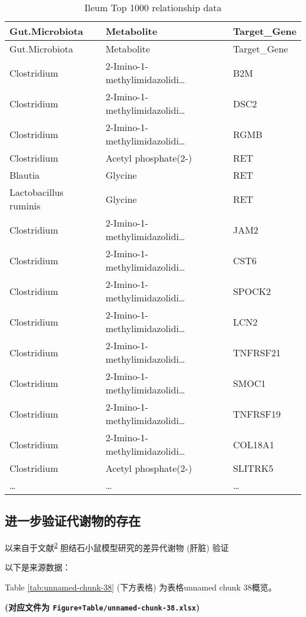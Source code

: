 \documentclass[
]{article}
\begin{document}
\begin{longtable}[]{@{}lll@{}}
\caption{\label{tab:Ileum-Top-1000-relationship-data}Ileum Top 1000 relationship data}\tabularnewline
\toprule
Gut.Microbiota & Metabolite & Target\_Gene\tabularnewline
\midrule
\endfirsthead
\toprule
Gut.Microbiota & Metabolite & Target\_Gene\tabularnewline
\midrule
\endhead
Clostridium & 2-Imino-1-methylimidazolidi\ldots{} & B2M\tabularnewline
Clostridium & 2-Imino-1-methylimidazolidi\ldots{} & DSC2\tabularnewline
Clostridium & 2-Imino-1-methylimidazolidi\ldots{} & RGMB\tabularnewline
Clostridium & Acetyl phosphate(2-) & RET\tabularnewline
Blautia & Glycine & RET\tabularnewline
Lactobacillus ruminis & Glycine & RET\tabularnewline
Clostridium & 2-Imino-1-methylimidazolidi\ldots{} & JAM2\tabularnewline
Clostridium & 2-Imino-1-methylimidazolidi\ldots{} & CST6\tabularnewline
Clostridium & 2-Imino-1-methylimidazolidi\ldots{} & SPOCK2\tabularnewline
Clostridium & 2-Imino-1-methylimidazolidi\ldots{} & LCN2\tabularnewline
Clostridium & 2-Imino-1-methylimidazolidi\ldots{} & TNFRSF21\tabularnewline
Clostridium & 2-Imino-1-methylimidazolidi\ldots{} & SMOC1\tabularnewline
Clostridium & 2-Imino-1-methylimidazolidi\ldots{} & TNFRSF19\tabularnewline
Clostridium & 2-Imino-1-methylimidazolidi\ldots{} & COL18A1\tabularnewline
Clostridium & Acetyl phosphate(2-) & SLITRK5\tabularnewline
\ldots{} & \ldots{} & \ldots{}\tabularnewline
\bottomrule
\end{longtable}

\hypertarget{ux8fdbux4e00ux6b65ux9a8cux8bc1ux4ee3ux8c22ux7269ux7684ux5b58ux5728}{%
\subsection{进一步验证代谢物的存在}\label{ux8fdbux4e00ux6b65ux9a8cux8bc1ux4ee3ux8c22ux7269ux7684ux5b58ux5728}}

以来自于文献\textsuperscript{\protect\hyperlink{ref-ChangesAndCorChen2021}{2}} 胆结石小鼠模型研究的差异代谢物 (肝脏) 验证

以下是来源数据：

Table \ref{tab:unnamed-chunk-38} (下方表格) 为表格unnamed chunk 38概览。

\textbf{(对应文件为 \texttt{Figure+Table/unnamed-chunk-38.xlsx})}
\end{document}
